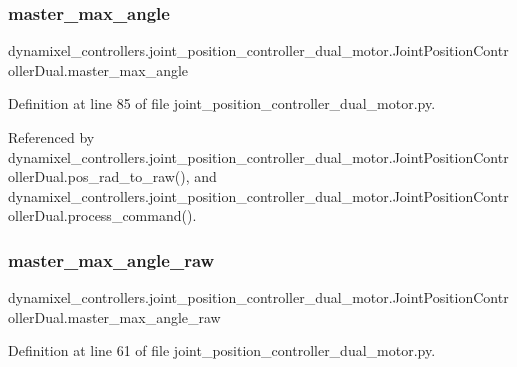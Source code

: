 \subsubsection{\texorpdfstring{master\+\_\+max\+\_\+angle}{master\_max\_angle}}
{\footnotesize\ttfamily dynamixel\+\_\+controllers.\+joint\+\_\+position\+\_\+controller\+\_\+dual\+\_\+motor.\+Joint\+Position\+Controller\+Dual.\+master\+\_\+max\+\_\+angle}



Definition at line 85 of file joint\+\_\+position\+\_\+controller\+\_\+dual\+\_\+motor.\+py.



Referenced by dynamixel\+\_\+controllers.\+joint\+\_\+position\+\_\+controller\+\_\+dual\+\_\+motor.\+Joint\+Position\+Controller\+Dual.\+pos\+\_\+rad\+\_\+to\+\_\+raw(), and dynamixel\+\_\+controllers.\+joint\+\_\+position\+\_\+controller\+\_\+dual\+\_\+motor.\+Joint\+Position\+Controller\+Dual.\+process\+\_\+command().

\mbox{\label{classdynamixel__controllers_1_1joint__position__controller__dual__motor_1_1_joint_position_controller_dual_a02096466e22fad9a6fb3ebbcf6f6aa48}} 
\subsubsection{\texorpdfstring{master\+\_\+max\+\_\+angle\+\_\+raw}{master\_max\_angle\_raw}}
{\footnotesize\ttfamily dynamixel\+\_\+controllers.\+joint\+\_\+position\+\_\+controller\+\_\+dual\+\_\+motor.\+Joint\+Position\+Controller\+Dual.\+master\+\_\+max\+\_\+angle\+\_\+raw}



Definition at line 61 of file joint\+\_\+position\+\_\+controller\+\_\+dual\+\_\+motor.\+py.

